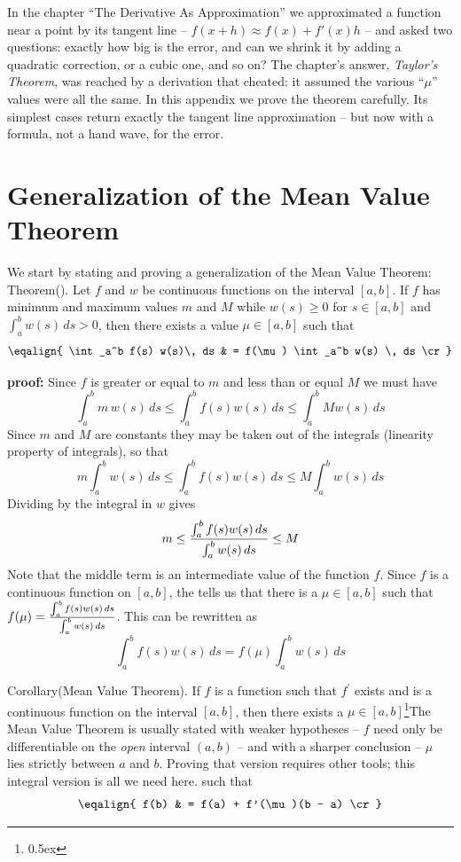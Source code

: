 %
%


In the chapter ``The Derivative As Approximation'' we approximated a function near a point by its
tangent line -- $f(x+h) \approx f(x) + f'(x) h$ -- and asked two questions: exactly how big is
the error, and can we shrink it by adding a quadratic correction, or a cubic one, and so on?
The chapter's answer, {\it Taylor's Theorem\/}, was reached by a derivation that cheated: it
assumed the various ``$\mu$'' values were all the same. In this appendix we prove the theorem
carefully. Its simplest cases return exactly the tangent line approximation -- but now with a
formula, not a hand wave, for the error.

\section{Generalization of the Mean Value Theorem}
We start by stating and proving a generalization of the Mean Value Theorem:
\proclaim Theorem(). Let $f$ and $w$ be continuous functions 
on the interval $[a,b]$. If $f$ has minimum and maximum values $m$ and $M$ while 
$w(s)  \ge 0$ for $s \in [a,b]$ and $\int_a^b w(s) \, ds > 0$,  then 
there exists a value $\mu \in [a,b]$ such that
$$
\eqalign{
\int_a^b f(s) w(s)\, ds & = f(\mu) \int_a^b w(s) \, ds \cr
}
$$

{\bf proof:\/} Since $f$ is greater or equal to $m$ and less than or equal $M$ we must have
$$
\int_a^b m\, w(s) \, ds \le \int_a^b f(s) w(s) \, ds \le \int_a^b M w(s) \, ds
$$
Since $m$ and $M$ are constants they may be taken out of the integrals (linearity property of integrals), 
so that
$$
m\int_a^b w(s) \, ds \le \int_a^b f(s) w(s) \, ds \le M \int_a^b w(s) \, ds
$$
Dividing by the integral in $w$ gives
$$
m \le {\int_a^b f(s) w(s) \, ds \over \int_a^b w(s) \, ds} \le M 
$$
Note that the middle term is an intermediate value of the function $f$.
Since $f$ is a continuous function on $[a,b]$, the  tells us that 
there is a $\mu\in[a,b]$
such that $f(\mu) = {\int_a^b f(s) w(s) \, ds \over \int_a^b w(s) \, ds}$. This can be rewritten as
$$
\int_a^b f(s) w(s) \, ds = f(\mu) \int_a^b w(s) \, ds
$$

\proclaim Corollary(Mean Value Theorem). If $f$ is a function such that $f^{\prime}$ exists and is a continuous function
on the interval $[a,b]$, then there exists a $\mu \in [a,b]$\footnote{\kern 0.5pt \raise 0.5ex \hbox{\dag}}{\rm The
Mean Value Theorem is usually stated with weaker hypotheses -- $f$ need only be differentiable on the {\it open\/}
interval $(a,b)$ -- and with a sharper conclusion -- $\mu$ lies strictly between $a$ and $b$. Proving that version
requires other tools; this integral version is all we need here.} such that
$$ 
\eqalign{
f(b) & = f(a) + f'(\mu)(b - a) \cr
}
$$

